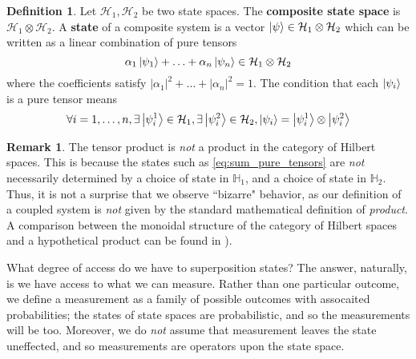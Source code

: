 \documentclass[12pt]{article}
\theoremstyle{plain}
\theoremstyle{definition}
\newtheorem{defn}[thm]{Definition} %
\newtheorem{remark}[thm]{Remark}
\newcommand{\bb}[1]{\mathbb{#1}}
\newcommand{\call}[1]{\mathcal{#1}}
\begin{document}
	\begin{defn}\label{def:composite_system}
		Let $\call{H}_1,\call{H}_2$ be two state spaces. The \textbf{composite state space} is $\call{H}_1 \otimes \call{H}_2$. A \textbf{state} of a composite system is a vector $\ket{\psi} \in \call{H}_1 \otimes \call{H}_2$ which can be written as a linear combination of pure tensors
		\begin{equation}\label{eq:sum_pure_tensors}
			\alpha_{1}\ket{\psi_1} + \ldots + \alpha_n\ket{\psi_n} \in \call{H}_1 \otimes \call{H}_2
			\end{equation}
		where the coefficients satisfy $|\alpha_1|^2 + \ldots + |\alpha_n|^2 = 1$. The condition that each $\ket{\psi_i}$ is a pure tensor means
		\begin{equation}
			\forall i =1,\ldots, n, \exists \ket{\psi_i^1}\in \call{H}_1,\exists \ket{\psi_i^2}\in \call{H}_2, \ket{\psi_i} = \ket{\psi_i^1} \otimes \ket{\psi_i^2}
			\end{equation}
	\end{defn}
	
	\begin{remark}
		The tensor product is \emph{not} a product in the category of Hilbert spaces. This is because the states such as \eqref{eq:sum_pure_tensors} are \emph{not} necessarily determined by a choice of state in $\bb{H}_1$, and a choice of state in $\bb{H}_2$. Thus, it is not a surprise that we observe ``bizarre" behavior, as our definition of a coupled system is \emph{not} given by the standard mathematical definition of \emph{product}. A comparison between the monoidal structure of the category of Hilbert spaces and a hypothetical product can be found in \cite{Baez}).
	\end{remark}
What degree of access do we have to superposition states? The answer, naturally, is we have access to what we can measure. Rather than one particular outcome, we define a measurement as a family of possible outcomes with assocaited probabilities; the states of state spaces are probabilistic, and so the measurements will be too. Moreover, we do \emph{not} assume that measurement leaves the state uneffected, and so measurements are operators upon the state space.
\end{document}
